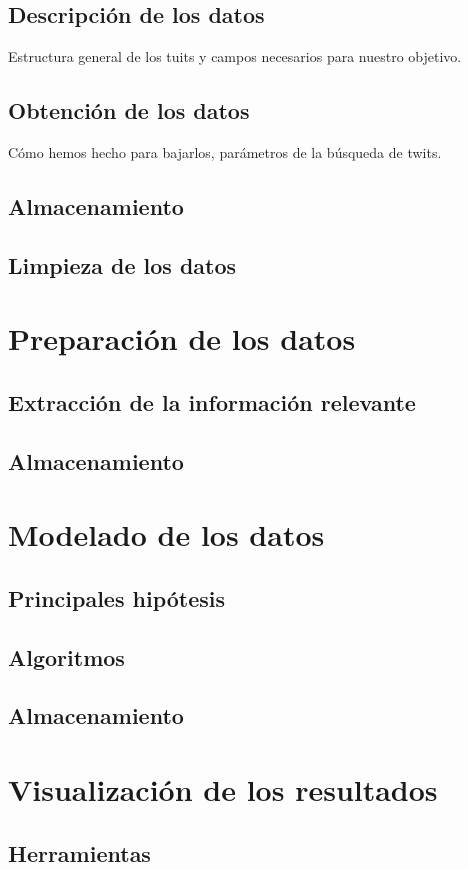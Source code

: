 \documentclass[11pt,a4paper,leqno,titlepage,twoside]{book}
\begin{document}
\section{Descripci\'on de los datos}
Estructura general de los tuits y campos necesarios para nuestro objetivo. 
\section{Obtenci\'on de los datos}
C\'omo hemos hecho para bajarlos, par\'ametros de la b\'usqueda de twits.
\section{Almacenamiento}
\section{Limpieza de los datos}

\chapter{Preparaci\'on de los datos}
\section{Extracci\'on de la informaci\'on relevante}
\section{Almacenamiento}

\chapter{Modelado de los datos}
\section{Principales hip\'otesis}
\section{Algoritmos}
\section{Almacenamiento}

\chapter{Visualizaci\'on de los resultados}
\section{Herramientas}
\end{document}
